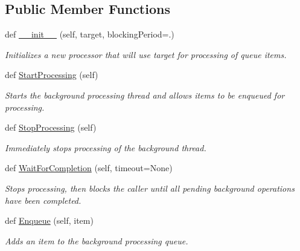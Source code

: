\subsection*{Public Member Functions}
\begin{DoxyCompactItemize}
\item 
def \hyperlink{classChronos_1_1Processor_1_1BackgroundQueueProcessor_a2cd0969918e4959ce583c9b12a7e6b5a}{\+\_\+\+\_\+init\+\_\+\+\_\+} (self, target, blocking\+Period=.)
\begin{DoxyCompactList}\small\item\em Initializes a new processor that will use {\ttfamily target} for processing of queue items. \end{DoxyCompactList}\item 
def \hyperlink{classChronos_1_1Processor_1_1BackgroundQueueProcessor_a068bfcde7824d370493ce51ab1fca2b5}{Start\+Processing} (self)
\begin{DoxyCompactList}\small\item\em Starts the background processing thread and allows items to be enqueued for processing. \end{DoxyCompactList}\item 
def \hyperlink{classChronos_1_1Processor_1_1BackgroundQueueProcessor_ad6d7bdd224004f0c6b879b084ec8be54}{Stop\+Processing} (self)
\begin{DoxyCompactList}\small\item\em Immediately stops processing of the background thread. \end{DoxyCompactList}\item 
def \hyperlink{classChronos_1_1Processor_1_1BackgroundQueueProcessor_a08781cc2357b3103cd58f3ae078e751e}{Wait\+For\+Completion} (self, timeout=None)
\begin{DoxyCompactList}\small\item\em Stops processing, then blocks the caller until all pending background operations have been completed. \end{DoxyCompactList}\item 
def \hyperlink{classChronos_1_1Processor_1_1BackgroundQueueProcessor_a9fa41560517ff5c0b4a40a7e16c555d4}{Enqueue} (self, item)
\begin{DoxyCompactList}\small\item\em Adds an item to the background processing queue. \end{DoxyCompactList}\end{DoxyCompactItemize}
